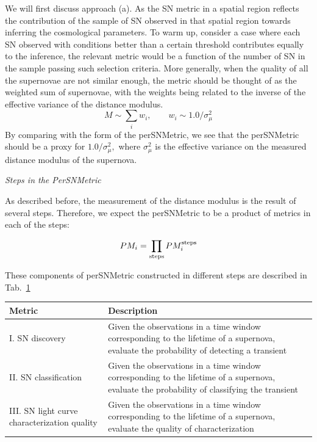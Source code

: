 We will first discuss approach (a).
As the SN metric in a spatial region reflects the contribution of the sample
of SN observed in that spatial region towards inferring the cosmological
parameters. To warm up, consider a case where each SN observed with conditions better than a certain threshold contributes equally to the inference, the
relevant metric would be a function of the number of SN in the sample passing
such selection criteria. More generally, when the quality of all the supernovae are not similar enough, the metric should be thought of as the weighted sum of supernovae, with the weights being related to the inverse of the effective 
variance of the distance modulus.
\begin{equation}
M\sim \sum_i w_i , \qquad  w_i \sim 1.0 /\sigma^2_\mu
\end{equation}
By comparing with the form of the perSNMetric, we see that the perSNMetric
should be a proxy for $1.0/\sigma^2_\mu,$ where $\sigma^2_\mu$ is the effective variance on the measured distance modulus of the supernova.

{\it  Steps in the PerSNMetric}

As described before, the measurement of the distance modulus is the result of several steps. Therefore, we expect the perSNMetric to be a product of metrics in each of the steps:

\begin{equation}
PM_i = \prod_{\rm{steps}} PM_i^{\rm{steps}}
\end{equation}

These components of perSNMetric constructed in different steps are described in Tab.~\ref{tab:stepsAndMetrics}
\begin{center}
 \begin{table}
\begin{tabular}{| p{5cm} |p{10cm}| }
\hline Metric & Description \\
\hline
I. SN discovery  &  Given the observations in a time window corresponding to the lifetime of a supernova, evaluate the  probability of detecting a
transient \\
II. SN classification & Given the observations in a time window corresponding to the lifetime of a supernova, evaluate the probability of classifying the transient\\
III. SN light curve characterization quality & Given the observations in a time window corresponding to the lifetime of a supernova, evaluate the quality of characterization\\
\hline \end{tabular}
\label{tab:stepsAndMetrics}
\end{table}
\end{center}





